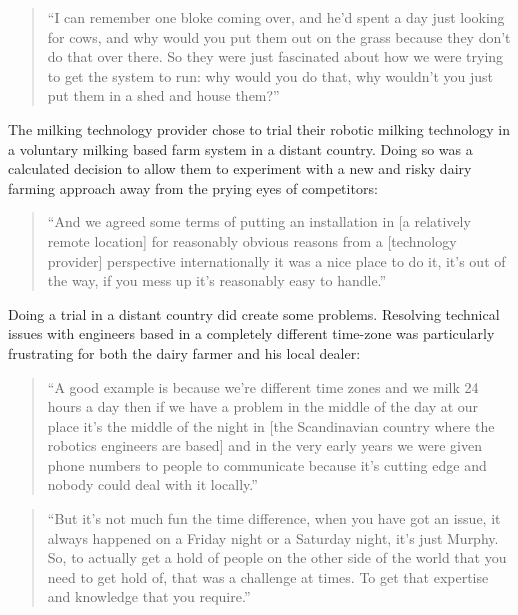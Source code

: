 \begin{quote}
\small
\enquote{I can remember one bloke coming over, and he'd spent a day just looking for cows, and why would you put them out on the grass because they don't do that over there. So they were just fascinated about how we were trying to get the system to run: why would you do that, why wouldn't you just put them in a shed and house them?} \\
\end{quote}

The milking technology provider chose to trial their robotic milking technology in a voluntary milking based farm system in a distant country. Doing so was a calculated decision to allow them to experiment with a new and risky dairy farming approach away from the prying eyes of competitors:

\begin{quote}
\small
\enquote{And we agreed some terms of putting an installation in [a relatively remote location] for reasonably obvious reasons from a [technology provider] perspective internationally it was a nice place to do it, it's out of the way, if you mess up it's reasonably easy to handle.} \\
\end{quote}

Doing a trial in a distant country did create some problems. Resolving technical issues with engineers based in a completely different time-zone was particularly frustrating for both the dairy farmer and his local dealer:

\begin{quote}
\small
\enquote{A good example is because we're different time zones and we milk 24 hours a day then if we have a problem in the middle of the day at our place it's the middle of the night in [the Scandinavian country where the robotics engineers are based] and in the very early years we were given phone numbers to people to communicate because it's cutting edge and nobody could deal with it locally.} \\
\end{quote}

\begin{quote}
\small
\enquote{But it's not much fun the time difference, when you have got an issue, it always happened on a Friday night or a Saturday night, it's just Murphy. So, to actually get a hold of people on the other side of the world that you need to get hold of, that was a challenge at times. To get that expertise and knowledge that you require.} \\
\end{quote}

